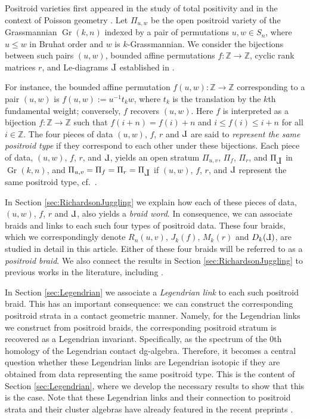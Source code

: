 \documentclass[10pt]{amsart}
\theoremstyle{plain}
\theoremstyle{definition}
\theoremstyle{remark}
\numberwithin{equation}{section}
\newcommand{\Z}{\mathbb{Z}}
\newcommand{\lr}{\longrightarrow}
\DeclareMathOperator{\Gr}{Gr}
\def\Le{\reflectbox{$\mathrm{L}$}}
\begin{document}
Positroid varieties first appeared in the study of total positivity \cite{Lusztig1994, Lusztig1998, Post, Rietsch} and in the context of Poisson geometry \cite{BGY}. Let ${\Pi}_{u,w}$ be the open positroid variety of the Grassmannian $\Gr(k,n)$ indexed by a pair of permutations $u,w\in S_n$, where $u\leq w$ in Bruhat order and $w$ is $k$-Grassmannian. We consider the bijections between such pairs $(u,w)$, bounded affine permutations $f:\Z\lr\Z$, cyclic rank matrices $r$,  and Le-diagrams $\Le$ established in \cite{KLS, Post}.

\noindent For instance, the bounded affine permutation $f(u,w):\Z\lr\Z$ corresponding to a pair $(u,w)$ is $f(u,w):=u^{-1}t_kw$, where $t_k$ is the translation by the $k$th fundamental weight; conversely, $f$ recovers $(u,w)$. Here $f$ is interpreted as a bijection $f:\Z\to \Z$ such that $f(i+n)=f(i)+n$ and  $i\le f(i)\le i+n$ for all $i\in\Z$. The four pieces of data $(u,w)$, $f$, $r$ and $\Le$ are said to {\it represent the same positroid type} if they correspond to each other under these bijections. Each piece of data, $(u,w)$, $f$, $r$, and $\Le$, yields an open stratum ${\Pi}_{u,v}$, ${\Pi}_{f}$, ${\Pi}_{r}$, and ${\Pi}_{\Le}$ in $\Gr(k,n)$, and ${\Pi}_{u,v} = {\Pi}_{f} = {\Pi}_{r} = {\Pi}_{\Le}$ if $(u,w)$, $f$, $r$, and $\Le$ represent the same positroid type, cf.~\cite{KLS}.

In Section \ref{sec:RichardsonJuggling} we explain how each of these pieces of data, $(u,w)$, $f$, $r$ and $\Le$, also yields a {\it braid word}. In consequence, we can associate braids and links to each such four types of positroid data. These four braids, which we correspondingly denote $R_n(u,v)$, $J_k(f)$, $M_k(r)$ and $D_{k}(\Le)$, are studied in detail in this article. Either of these four braids will be referred to as a {\it positroid braid}. We also connect the results in Section \ref{sec:RichardsonJuggling} to previous works in the literature, including \cite{GL,KLS,STWZ}.

In Section \ref{sec:Legendrian} we associate a {\it Legendrian link} to each such positroid braid. This has an important consequence: we can construct the corresponding positroid strata in a contact geometric manner. Namely, for the Legendrian links we construct from positroid braids, the corresponding positroid stratum is recovered as a Legendrian invariant. Specifically, as the spectrum of the $0$th homology of the Legendrian contact dg-algebra. Therefore,  it becomes a central question whether these Legendrian links are Legendrian isotopic if they are obtained from data representing the same positroid type. This is the content of Section \ref{sec:Legendrian}, where we develop the necessary results to show that this is the case. Note that these Legendrian links and their connection to positroid strata and their cluster algebras have already featured in the recent preprints \cite{asplund2023lagrangian,cgglss,CGLSBW,glsbs,glsb}.
\end{document}
